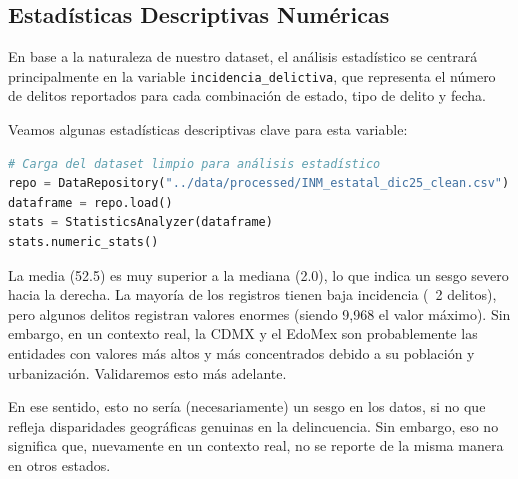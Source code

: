 \subsection{Estadísticas Descriptivas Numéricas}

En base a la naturaleza de nuestro dataset, el análisis estadístico se centrará principalmente en la variable \texttt{incidencia\_delictiva},
que representa el número de delitos reportados para cada combinación de estado, tipo de delito y fecha.

Veamos algunas estadísticas descriptivas clave para esta variable:

\begin{lstlisting}[language=Python, caption={Código para obtener estadísticas descriptivas numéricas}, label={lst:stats-descriptivas-numericas}]
# Carga del dataset limpio para análisis estadístico
repo = DataRepository("../data/processed/INM_estatal_dic25_clean.csv")
dataframe = repo.load()
stats = StatisticsAnalyzer(dataframe)
stats.numeric_stats()
\end{lstlisting}

\begin{table}[ht]
  \centering
  \caption{Estadísticas Descriptivas Numéricas}
  \scriptsize
  \label{tab:numeric-stats}
\end{table}

La media (52.5) es muy superior a la mediana (2.0), lo que indica un sesgo severo hacia la derecha. La mayoría de los registros
tienen baja incidencia (~2 delitos), pero algunos delitos registran valores enormes (siendo 9,968 el valor máximo). Sin embargo,
en un contexto real, la CDMX y el EdoMex son probablemente las entidades con valores más altos y más concentrados debido a su población
y urbanización. Validaremos esto más adelante.

En ese sentido, esto no sería (necesariamente) un sesgo en los datos, si no que refleja disparidades geográficas genuinas en la delincuencia.
Sin embargo, eso no significa que, nuevamente en un contexto real, no se reporte de la misma manera en otros estados.

